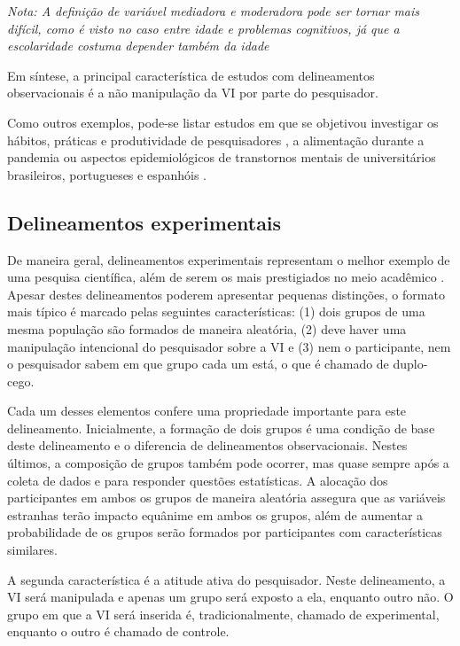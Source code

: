 \documentclass[
]{book}
\begin{document}
\emph{Nota: A definição de variável mediadora e moderadora pode ser tornar mais difícil, como é visto no caso entre idade e problemas cognitivos, já que a escolaridade costuma depender também da idade}

Em síntese, a principal característica de estudos com delineamentos observacionais é a não manipulação da VI por parte do pesquisador.

Como outros exemplos, pode-se listar estudos em que se objetivou investigar os hábitos, práticas e produtividade de pesquisadores \citep{Wenke2017}, a alimentação durante a pandemia \citep{Amatori2020} ou aspectos epidemiológicos de transtornos mentais de universitários brasileiros, portugueses e espanhóis \citep{AfonsoJunior2020}.

\hypertarget{delineamentos-experimentais}{%
\subsection{Delineamentos experimentais}\label{delineamentos-experimentais}}

De maneira geral, delineamentos experimentais representam o melhor exemplo de uma pesquisa científica, além de serem os mais prestigiados no meio acadêmico \citep{gil2002}. Apesar destes delineamentos poderem apresentar pequenas distinções, o formato mais típico é marcado pelas seguintes características: (1) dois grupos de uma mesma população são formados de maneira aleatória, (2) deve haver uma manipulação intencional do pesquisador sobre a VI e (3) nem o participante, nem o pesquisador sabem em que grupo cada um está, o que é chamado de duplo-cego.

Cada um desses elementos confere uma propriedade importante para este delineamento. Inicialmente, a formação de dois grupos é uma condição de base deste delineamento e o diferencia de delineamentos observacionais. Nestes últimos, a composição de grupos também pode ocorrer, mas quase sempre após a coleta de dados e para responder questões estatísticas. A alocação dos participantes em ambos os grupos de maneira aleatória assegura que as variáveis estranhas terão impacto equânime em ambos os grupos, além de aumentar a probabilidade de os grupos serão formados por participantes com características similares.

A segunda característica é a atitude ativa do pesquisador. Neste delineamento, a VI será manipulada e apenas um grupo será exposto a ela, enquanto outro não. O grupo em que a VI será inserida é, tradicionalmente, chamado de experimental, enquanto o outro é chamado de controle.
\end{document}
